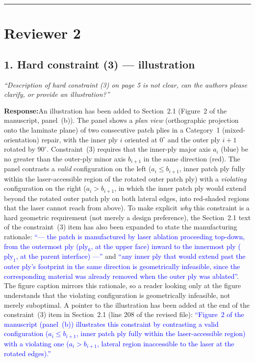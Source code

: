 \documentclass[11pt,a4paper]{article}
\newcommand{\new}[1]{\textcolor{blue}{#1}}
\newcommand{\rev}[1]{\par\noindent\textit{\small #1}\par\smallskip}
\newcommand{\resp}{\par\noindent\textbf{Response:}\space}
\begin{document}
\medskip
\hrule
\medskip

\section*{Reviewer 2}

\subsection*{1. Hard constraint (3) --- illustration}
\rev{``Description of hard constraint (3) on page 5 is not clear, can the authors please clarify, or provide an illustration?''}
\resp An illustration has been added to Section~2.1 (Figure~2 of the manuscript, panel~(b)). The panel shows a \emph{plan view} (orthographic projection onto the laminate plane) of two consecutive patch plies in a Category~1 (mixed-orientation) repair, with the inner ply $i$ oriented at $0^{\circ}$ and the outer ply $i+1$ rotated by $90^{\circ}$. Constraint~(3) requires that the inner-ply major axis $a_i$ (blue) be no greater than the outer-ply minor axis $b_{i+1}$ in the same direction (red). The panel contrasts a \emph{valid} configuration on the left ($a_i \leq b_{i+1}$, inner patch ply fully within the laser-accessible region of the rotated outer patch ply) with a \emph{violating} configuration on the right ($a_i > b_{i+1}$, in which the inner patch ply would extend beyond the rotated outer patch ply on both lateral edges, into red-shaded regions that the laser cannot reach from above). To make explicit \emph{why} this constraint is a hard geometric requirement (not merely a design preference), the Section~2.1 text of the constraint~(3) item has also been expanded to state the manufacturing rationale: \new{``--- the patch is manufactured by laser ablation proceeding top-down, from the outermost ply ($\text{ply}_6$, at the upper face) inward to the innermost ply ($\text{ply}_1$, at the parent interface) ---''} and \new{``any inner ply that would extend past the outer ply's footprint in the same direction is geometrically infeasible, since the corresponding material was already removed when the outer ply was ablated''}. The figure caption mirrors this rationale, so a reader looking only at the figure understands that the violating configuration is geometrically infeasible, not merely suboptimal. A pointer to the illustration has been added at the end of the constraint~(3) item in Section~2.1 (line 208 of the revised file): \new{``Figure~2 of the manuscript (panel~(b)) illustrates this constraint by contrasting a valid configuration ($a_i \leq b_{i+1}$, inner patch ply fully within the laser-accessible region) with a violating one ($a_i > b_{i+1}$, lateral region inaccessible to the laser at the rotated edges).''}
\end{document}
